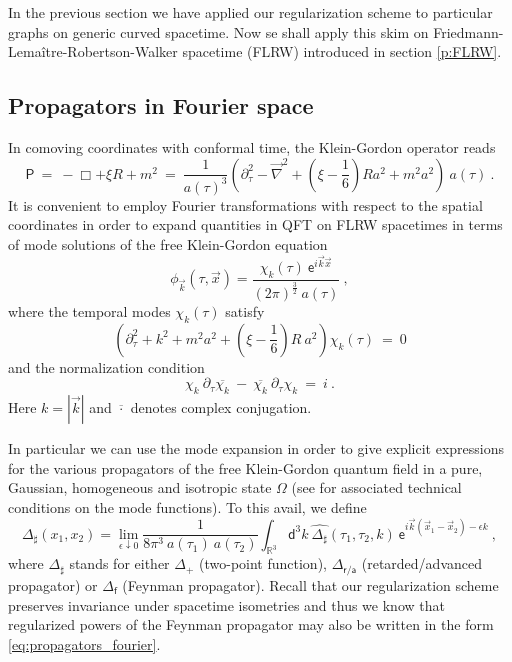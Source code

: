 \documentclass[11pt]{book}
\newcommand{\abs}[1]{\left|#1\right|}
\newcommand{\Psf}{\mathsf{P}}
\newcommand{\asf}{\mathsf{a}}
\newcommand{\dsf}{\mathsf{d}}
\newcommand{\esf}{\mathsf{e}}
\newcommand{\fsf}{\mathsf{f}}
\newcommand{\rsf}{\mathsf{r}}
\theoremstyle{break}
\begin{document}
In the previous section we have applied our regularization scheme to particular graphs on generic curved spacetime. Now se shall apply this skim on Friedmann-Lemaître-Robertson-Walker spacetime (FLRW) introduced in section \ref{p:FLRW}.


\subsection{Propagators in Fourier space}


In comoving coordinates with conformal time, the Klein-Gordon operator reads
%
\begin{equation*}
\Psf \ = \ - \Box + \xi R + m^2 \ = \ \frac{1}{a(\tau)^3} \left(\partial^2_\tau-\vec{\nabla}^2 + \left(\xi-\frac16\right)R a^2+m^2a^2\right) \ a(\tau) \ .
\end{equation*}
%
It is convenient to employ Fourier transformations with respect to the spatial coordinates in order to expand quantities in QFT on FLRW spacetimes in terms of mode solutions of the free Klein-Gordon equation
%
\begin{equation*}
\phi_{\vec{k}}(\tau,\vec{x}) = \frac{\chi_k(\tau) \ \esf^{i\vec{k}\vec{x}}}{(2\pi)^{\frac32} \ a(\tau)} \ , 
\end{equation*}
%
where the temporal modes $\chi_k(\tau)$ satisfy
%
\begin{equation}
\left(\partial^2_\tau + k^2 + m^2 a^2 + \left( \xi - \frac16 \right) R \ a^2 \right) \chi_k(\tau) \ = \ 0
\label{eq:modes}
\end{equation}
%
and the normalization condition
%
\begin{equation}
\chi_k \ \partial_\tau \overline{\chi_k} \ - \ \overline{\chi_k} \ \partial_\tau{\chi_k} \ = \ i \ .
\label{eq:modes_normal}
\end{equation}
%
Here $k = \abs{\vec{k}}$ and $\overline{\cdot}$ denotes complex conjugation.


In particular we can use the mode expansion in order to give explicit expressions for the various propagators of the free Klein-Gordon quantum field in a pure, Gaussian, homogeneous and isotropic state $\Omega$ (see \cite{pinamonti_initial_2011,zschoche_chaplygin_2014}
for associated technical conditions on the mode functions). To this avail, we define
%
\begin{equation}
\Delta_\sharp(x_1,x_2) = \lim_{\epsilon\downarrow 0} \frac{1}{8\pi^3 \ a(\tau_1) \ a(\tau_2)} \int_{\mathbb{R}^3} \dsf^3k \ \widehat{\Delta_\sharp}(\tau_1,\tau_2,k) \ \esf^{i\vec{k}(\vec{x}_1-\vec{x}_2)-\epsilon k} \ ,
\label{eq:propagators_fourier}
\end{equation}
%
where $\Delta_\sharp$ stands for either $\Delta_+$ (two-point function), $\Delta_{\rsf/\asf}$ (retarded/advanced propagator) or $\Delta_\fsf$ (Feynman propagator). Recall that our regularization scheme preserves invariance under spacetime isometries and thus we know that regularized powers of the Feynman propagator may also be written in the form \eqref{eq:propagators_fourier}.
\end{document}
